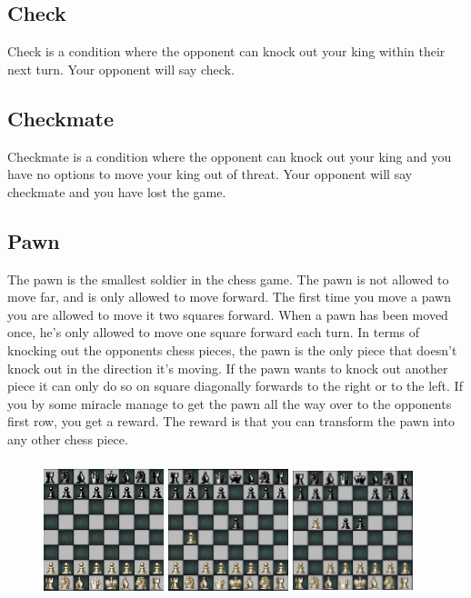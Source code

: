 \documentclass{article}
\begin{document}
\subsection*{Check}
Check is a condition where the opponent can knock out your king within their next turn. Your opponent will say check.

\subsection*{Checkmate} Checkmate is a condition where the opponent can knock out your king and you have no options to move your king out of threat. Your opponent will say checkmate and you have lost the game.

\subsection*{Pawn} The pawn is the smallest soldier in the chess game. The pawn is not allowed to move far, and is only allowed to move forward. The first time you move a pawn you are allowed to move it two squares forward. When a pawn has been moved once, he’s only allowed to move one square forward each turn. In terms of knocking out the opponents chess pieces, the pawn is the only piece that doesn’t knock out in the direction it’s moving. If the pawn wants to knock out another piece it can only do so on square diagonally forwards to the right or to the left.
If you by some miracle manage to get the pawn all the way over to the opponents first row, you get a reward. The reward is that you can transform the pawn into any other chess piece.  
\begin{figure}[h]
\includegraphics[width=3.5cm, height=4cm]{pawn1} \includegraphics[width=3.5cm, height=4cm]{pawn2} \includegraphics[width=3.5cm, height=4cm]{pawn3}
\end{figure}
\end{document}

